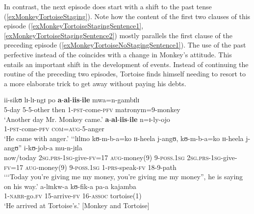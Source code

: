 In contrast, the next episode does start with a shift to the past tense (\ref{exMonkeyTortoiseStaging}). Note how the content of the first two clauses of this episode (\ref{exMonkeyTortoiseStagingSentence1}, \ref{exMonkeyTortoiseStagingSentence2}) mostly parallels the first clause of the preceding episode (\ref{exMonkeyTortoiseNoStagingSentence1}). The use of the past perfective instead of the  coincides with a change in Monkey's attitude. This entails an important shift in the development of events. Instead of continuing the routine of the preceding two episodes, Tortoise finds himself needing to resort to a more elaborate trick to get away without paying his debts.
\begin{exe}
\ex\label{exMonkeyTortoiseStaging} 
\begin{xlist}
\ex \label{exMonkeyTortoiseStagingSentence1} \gll ii-sikʊ lɪ-lɪ-ngɪ po \textbf{a}-\textbf{al}-\textbf{iis}-\textbf{ile} mwa=n-gambɪlɪ\\
5-day 5-5-other then 1-\textsc{pst}-come-\textsc{pfv} matronym=9-monkey\\
\glt \lq Another day Mr. Monkey came.'
\ex \label{exMonkeyTortoiseStagingSentence2} \gll \textbf{a}-\textbf{al}-\textbf{iis}-\textbf{ile} n=ɪ-ly-ojo\\
1-\textsc{pst}-come-\textsc{pfv} \textsc{com}=\textsc{aug}-5-anger\\
\glt \lq He came with anger.'
\ex \gll \textup{\lq\lq}lɪlɪno kʊ-m-b-a=ko ɪɪ-heela j-angʊ, kʊ-m-b-a=ko ɪɪ-heela j-angʊ\textup{''} i-kʊ-job-a mu-n-jɪla\\
\phantom{\lq\lq}now/today \textsc{2sg.prs}-\textsc{1sg}-give-\textsc{fv}=17 \textsc{aug}-money(9) 9-\textsc{poss.1sg} \textsc{2sg.prs}-\textsc{1sg}-give-\textsc{fv}=17 \textsc{aug}-money(9) 9-\textsc{poss.1sg} 1-\textsc{prs}-speak-\textsc{fv} 18-9-path\\
\glt \lq\lq \lq Today you're giving me my money, you're giving me my money'', he is saying on his way.'
\ex\gll a-lɪnkw-a kʊ-fik-a pa-a kajamba\\
1-\textsc{narr}-go.\textsc{fv} 15-arrive-\textsc{fv} 16-\textsc{assoc} tortoise(1)\\
\glt \lq He arrived at Tortoise's.' [Monkey and Tortoise]
\end{xlist}
\end{exe}

